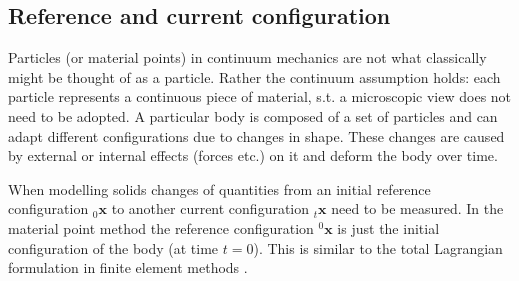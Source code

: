 \documentclass[m,times]{cgMA}
\begin{document}
\subsection{Reference and current configuration}\label{sec:ref_corr_config}
Particles (or material points) in continuum mechanics are not what classically might be thought of as a particle. Rather the continuum assumption holds: each particle represents a continuous piece of material, s.t. a microscopic view does not need to be adopted. A particular body is composed of a set of particles and can adapt different configurations due to changes in shape. These changes are caused by external or internal effects (forces etc.) on it and deform the body over time. \cite{MIT:CONTINUUM_MECHANICS} \cite{MPM:COURSE}


When modelling solids changes of quantities from an initial reference configuration $_0\boldsymbol{x}$ to another current configuration $_t\boldsymbol{x}$ need to be measured. In the material point method the reference configuration $^0\boldsymbol{x}$ is just the initial configuration of the body (at time $t=0$). This is similar to the total Lagrangian formulation in finite element methods \cite{bathe2006finite}.
\end{document}
